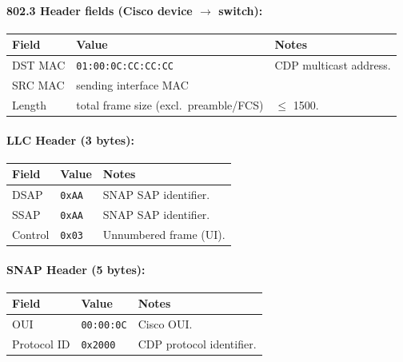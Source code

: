 \documentclass[12pt,a4paper]{article}
\begin{document}
\paragraph{802.3 Header fields (Cisco device $\to$ switch):}
\begin{center}
\begin{tabular}{lll}
\toprule
\textbf{Field}   & \textbf{Value}                        & \textbf{Notes} \\
\midrule
DST MAC          & \texttt{01:00:0C:CC:CC:CC}            & CDP multicast address. \\
SRC MAC          & sending interface MAC                  & \\
Length           & total frame size (excl.\ preamble/FCS) & $\leq$ 1500. \\
\bottomrule
\end{tabular}
\end{center}

\paragraph{LLC Header (3 bytes):}
\begin{center}
\begin{tabular}{lll}
\toprule
\textbf{Field}   & \textbf{Value} & \textbf{Notes} \\
\midrule
DSAP             & \texttt{0xAA}  & SNAP SAP identifier. \\
SSAP             & \texttt{0xAA}  & SNAP SAP identifier. \\
Control          & \texttt{0x03}  & Unnumbered frame (UI). \\
\bottomrule
\end{tabular}
\end{center}

\paragraph{SNAP Header (5 bytes):}
\begin{center}
\begin{tabular}{lll}
\toprule
\textbf{Field}   & \textbf{Value}         & \textbf{Notes} \\
\midrule
OUI              & \texttt{00:00:0C}      & Cisco OUI. \\
Protocol ID      & \texttt{0x2000}        & CDP protocol identifier. \\
\bottomrule
\end{tabular}
\end{center}
\end{document}
